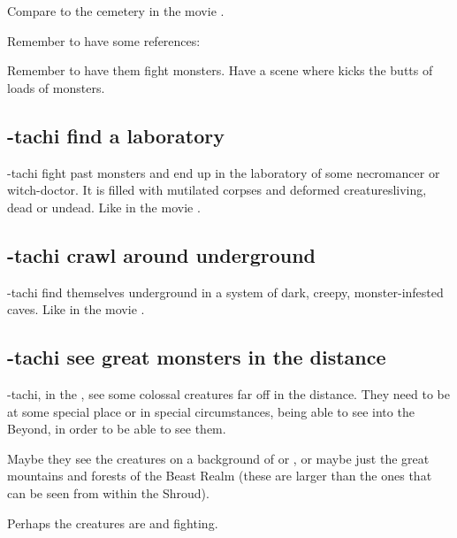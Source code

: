 Compare to the cemetery in the movie \cite{Movie:HouseoftheDead}. 

Remember to have some references: 

Remember to have them fight monsters. Have a scene where \Dzasselid{} kicks the butts of loads of monsters. 







\subsection{\Shilred-tachi find a laboratory}
\Shilred-tachi fight past monsters and end up in the laboratory of some necromancer or witch-doctor. It is filled with mutilated corpses and deformed creatures\dash living, dead or undead. Like in the movie \cite{Movie:HouseoftheDead}. 







\subsection{\Shilred-tachi crawl around underground}
\Shilred-tachi find themselves underground in a system of dark, creepy, monster-infested caves. Like in the movie \cite{Movie:HouseoftheDead}. 








\subsection{\Shilred{}-tachi see great monsters in the distance}
\Shilred-tachi, \travelling in the \Wylde{}, see some colossal creatures far off in the distance. They need to be at some special place or in special circumstances, being able to see into the Beyond, in order to be able to see them. 

Maybe they see the creatures on a background of \Nyx{} or \Machai{}, or maybe just the great mountains and forests of the Beast Realm (these are larger than the ones that can be seen from within the Shroud). 

Perhaps the creatures are \dragons{} and \banes{} fighting. 

